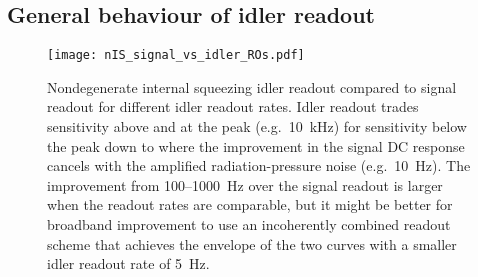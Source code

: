 \subsection{General behaviour of idler readout}
\label{sec:nIS_general_behaviour_idler}

\begin{figure}
    \centering
    \texttt{[image: nIS\_signal\_vs\_idler\_ROs.pdf]}
    \caption{  Nondegenerate internal squeezing idler readout compared to signal readout for different idler readout rates. Idler readout trades sensitivity above and at the peak (e.g.\ 10~kHz) for sensitivity below the peak down to where the improvement in the signal DC response cancels with the amplified radiation-pressure noise (e.g.\ 10~Hz). The improvement from 100--1000~Hz over the signal readout is larger when the readout rates are comparable, but it might be better for broadband improvement to use an incoherently combined readout scheme that achieves the envelope of the two curves with a smaller idler readout rate of 5~Hz.
    }
    \label{fig:nIS_signal_vs_idler_ROs}
\end{figure}

